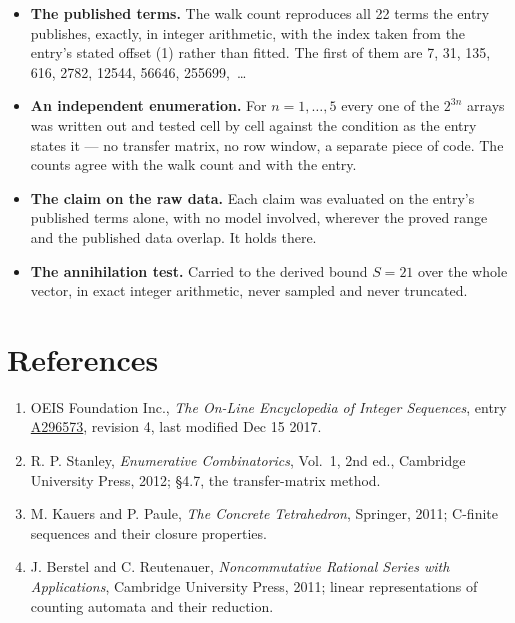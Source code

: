 \documentclass[11pt]{article}
\theoremstyle{definition}
\begin{document}
\begin{itemize}

\item {\bfseries The published terms.} The walk count reproduces all 22 terms the entry publishes, exactly, in integer arithmetic, with the index taken from the entry's stated offset (1) rather than fitted. The first of them are 7, 31, 135, 616, 2782, 12544, 56646, 255699,~\dots

\item {\bfseries An independent enumeration.} For $n = 1,\dots,5$ every one of the $2^{3n}$ arrays was written out and tested cell by cell against the condition as the entry states it --- no transfer matrix, no row window, a separate piece of code. The counts agree with the walk count and with the entry.

\item {\bfseries The claim on the raw data.} Each claim was evaluated on the entry's published terms alone, with no model involved, wherever the proved range and the published data overlap. It holds there.

\item {\bfseries The annihilation test.} Carried to the derived bound $S = 21$ over the whole vector, in exact integer arithmetic, never sampled and never truncated.

\end{itemize}

\section{References}

\begin{enumerate}

\item OEIS Foundation Inc., \emph{The On-Line Encyclopedia of Integer Sequences}, entry \href{https://oeis.org/A296573}{A296573}, revision 4, last modified Dec 15 2017.

\item R. P. Stanley, \emph{Enumerative Combinatorics}, Vol.~1, 2nd ed., Cambridge University Press, 2012; \S4.7, the transfer-matrix method.

\item M. Kauers and P. Paule, \emph{The Concrete Tetrahedron}, Springer, 2011; C-finite sequences and their closure properties.

\item J. Berstel and C. Reutenauer, \emph{Noncommutative Rational Series with Applications}, Cambridge University Press, 2011; linear representations of counting automata and their reduction.

\end{enumerate}
\end{document}
